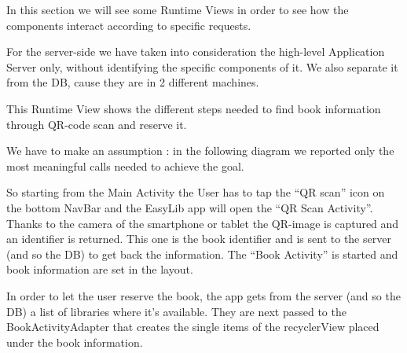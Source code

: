 \vspace*{-5mm}
In this section we will see some Runtime Views in order to see how the components interact according to specific requests.\par
For the server-side we have taken into consideration the high-level Application Server only, without identifying the specific components of it. We also separate it from the DB, cause they are in 2 different machines.

\vspace*{0.5cm}

This Runtime View shows the different steps needed to find book information through QR-code scan and reserve it.\par
We have to make an assumption : in the following diagram we reported only the most meaningful calls needed to achieve the goal.\par
So starting from the Main Activity the User has to tap the “QR scan” icon on the bottom NavBar and the EasyLib app will open the “QR Scan Activity”. Thanks to the camera of the smartphone or tablet the QR-image is captured and an identifier is returned. This one is the book identifier and is sent to the server (and so the DB) to get back the information. The “Book Activity” is started and book information are set in the layout.\par
In order to let the user reserve the book, the app gets from the server (and so the DB) a list of libraries where it’s available. They are next passed to the BookActivityAdapter that creates the single items of the recyclerView placed under the book information.
\newpage
\vspace*{0cm}
